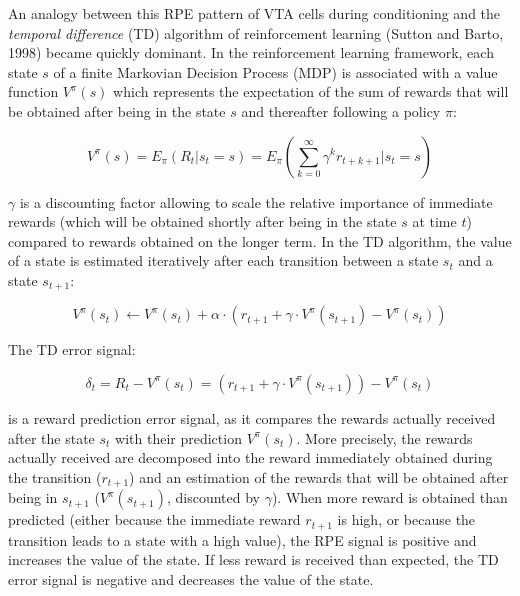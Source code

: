 \documentclass[
  11pt,
  a4paper,
]{scrbook}
\begin{document}
An analogy between this RPE pattern of VTA cells during conditioning and
the \emph{temporal difference} (TD) algorithm of reinforcement learning
(Sutton and Barto, 1998) became quickly dominant. In the reinforcement
learning framework, each state \(s\) of a finite Markovian Decision
Process (MDP) is associated with a value function \(V^\pi (s)\) which
represents the expectation of the sum of rewards that will be obtained
after being in the state \(s\) and thereafter following a policy
\(\pi\):

\[
    V^{\pi} (s) = E_{\pi} ( R_t | s_t = s) = E_{\pi} ( \sum_{k=0}^{\infty} \gamma^k r_{t+k+1} | s_t = s )
\]

\(\gamma\) is a discounting factor allowing to scale the relative
importance of immediate rewards (which will be obtained shortly after
being in the state \(s\) at time \(t\)) compared to rewards obtained on
the longer term. In the TD algorithm, the value of a state is estimated
iteratively after each transition between a state \(s_t\) and a state
\(s_{t+1}\):

\[
    V^{\pi}(s_t) \leftarrow V^{\pi}(s_t) + \alpha \cdot (r_{t+1} + \gamma\cdot V^{\pi}(s_{t+1}) - V^{\pi}(s_t) )
\]

The TD error signal:

\[
    \delta_t = R_t - V^{\pi}(s_t) = (r_{t+1} + \gamma\cdot V^{\pi}(s_{t+1}) ) - V^{\pi}(s_t)
\]

is a reward prediction error signal, as it compares the rewards actually
received after the state \(s_t\) with their prediction \(V^{\pi}(s_t)\).
More precisely, the rewards actually received are decomposed into the
reward immediately obtained during the transition (\(r_{t+1}\)) and an
estimation of the rewards that will be obtained after being in
\(s_{t+1}\) (\(V^{\pi}(s_{t+1})\), discounted by \(\gamma\)). When more
reward is obtained than predicted (either because the immediate reward
\(r_{t+1}\) is high, or because the transition leads to a state with a
high value), the RPE signal is positive and increases the value of the
state. If less reward is received than expected, the TD error signal is
negative and decreases the value of the state.
\end{document}
